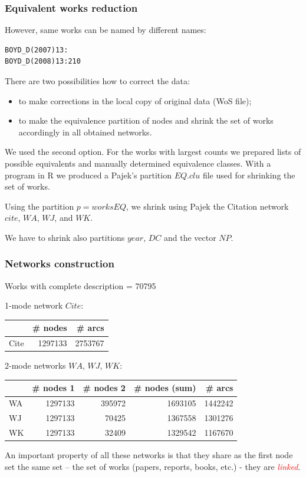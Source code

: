 \documentclass[hyperref={pdfstartview={FitBH -32768},
                         pdfpagemode=FullScreen,
                         plainpages=false,
                         colorlinks=true}
              ]{beamer}
\newcommand{\keyw}[1]{\textcolor{red}{\emph{#1}}}
\begin{document}
\begin{frame}[fragile]
\frametitle{Equivalent works reduction}
\small 
However, same works can be named by different names:
\begin{verbatim}
BOYD_D(2007)13:
BOYD_D(2008)13:210
\end{verbatim}

There are two possibilities how to correct the data:
\begin{itemize}
\item to make corrections in the local copy of original data (WoS file);
\item to make the equivalence partition of nodes and shrink the set of works accordingly in all  obtained networks.
\end{itemize}
We used the second option. For the works with largest counts we prepared lists of possible equivalents and manually determined equivalence classes. With a program in R we produced a Pajek's partition $EQ.clu$ file used for shrinking the set of works. \medskip

Using the partition $p=worksEQ$, we shrink using Pajek the Citation network $cite$, $WA$, $WJ$, and $WK$. \medskip

We have to shrink also partitions $year$,  $DC$ and the vector $NP$. 

\end{frame}

\begin{frame}[fragile]
\frametitle{Networks construction}
\small 

Works with complete description = 70795 \medskip

1-mode network $Cite$: \medskip

\begin{center}
\begin{tabular}{l|r|r|}
 	& \# nodes & \# arcs \\ \hline		
Cite	& 1297133	& 2753767	\\ \hline
\end{tabular}
\end{center}
\bigskip

2-mode networks $WA$, $WJ$, $WK$:  \medskip 

\begin{tabular}{l|r|r|r|r|}
	&\# nodes 1	& \# nodes 2	&\# nodes (sum)	& \# arcs \\ \hline		 
WA	& 1297133	          & 395972	          & 1693105	           & 1442242 \\ 
WJ	& 1297133	          & 70425	          & 1367558	           & 1301276 \\ 
WK 	& 1297133	          & 32409	          & 1329542	           & 1167670 \\  \hline 
\end{tabular}\bigskip				

An important property of all these networks is that they share as the first node set the same set – the set of works (papers, reports, books, etc.) - they are \keyw{linked}.

\end{frame}
\end{document}
